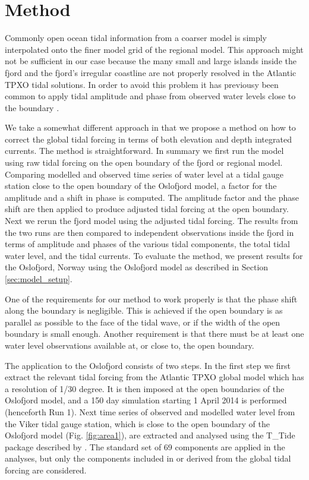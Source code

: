 \section{Method}

Commonly open ocean tidal information from a coarser model is simply interpolated onto the finer model grid of the regional model. This approach might not be sufficient in our case because the many small and large islands inside the fjord and the fjord's irregular coastline are not properly resolved in the Atlantic TPXO tidal solutions. In order to avoid this problem it has previousy been common to apply tidal amplitude and phase from observed water levels close to the boundary \cite[i.e.]{foreman90,svendsen96,lynge13}. 

We take a somewhat different approach in that we propose a method on how to correct the global tidal forcing in terms of both elevation and depth integrated currents. The method is straightforward. In summary we first run the model using raw tidal forcing on the open boundary of the fjord or regional model. Comparing modelled and observed time series of water level at a tidal gauge station close to the open boundary of the Oslofjord model, a factor for the amplitude and a shift in phase is computed. The amplitude factor and the phase shift are then applied to produce adjusted tidal forcing at the open boundary. Next we rerun the fjord model using the adjusted tidal forcing. The results from the two runs are then compared to independent observations inside the fjord in terms of amplitude and phases of the various tidal components, the total tidal water level, and the tidal currents. To evaluate the method, we present results for the Oslofjord, Norway using the Oslofjord model as described in Section \ref{sec:model_setup}. 

One of the requirements for our method to work properly is that the phase shift along the boundary is negligible. This is achieved if the open boundary is as parallel as possible to the face of the tidal wave, or if the width of the open boundary is small enough. Another requirement is that there must be at least one water level observations available at, or close to, the open boundary.

The application to the Oslofjord consists of two steps. In the first step we first extract the relevant tidal forcing from the Atlantic TPXO global model which has a resolution of 1/30 degree. It is then imposed at the open boundaries of the Oslofjord model, and a 150 day simulation starting 1 April 2014 is performed (henceforth Run 1). Next time series of observed and modelled water level from the Viker tidal gauge station, which is close to the open boundary of the Oslofjord model (Fig. \ref{fig:area1}), are extracted and analysed using the T\_Tide package described by \cite{pawlowicz02}. The standard set of 69 components are applied in the analyses, but only the components included in or derived from the global tidal forcing are considered.
 
